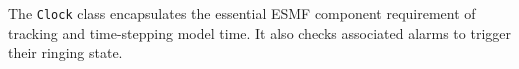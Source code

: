 
\label{sec:Clock}
The {\tt Clock} class encapsulates the essential ESMF component requirement
of tracking and time-stepping model time.  It also checks associated alarms
to trigger their ringing state.
